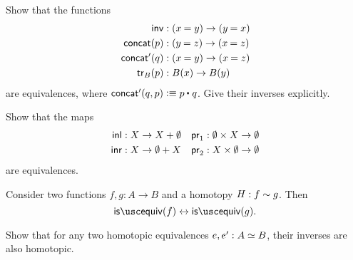 \begin{exercises}
\item \label{ex:equiv_grpd_ops}Show that the functions
  \begin{align*}
    \mathsf{inv} & :(\id{x}{y})\to(\id{y}{x}) \\
    \mathsf{concat}(p) & : (\id{y}{z})\to(\id{x}{z}) \\
    \mathsf{concat'}(q) & : (\id{x}{y}) \to (\id{x}{z}) \\
    \mathsf{tr}_B(p) & :B(x)\to B(y)
  \end{align*}
  are equivalences, where $\mathsf{concat'}(q,p)\defeq \ct{p}{q}$. Give their inverses explicitly.
\item Show that the maps
  \begin{align*}
    {\mathsf{inl}} & : X \to X+\emptyset &     \mathsf{pr}_{1} & : \emptyset \times X \to \emptyset \\
    {\mathsf{inr}} & : X \to \emptyset+X &    \mathsf{pr}_{2} & : X \times \emptyset \to \emptyset
  \end{align*}
  are equivalences.
\item
  \begin{subexenum}
  \item \label{ex:htpy_equiv} Consider two functions $f,g:A\to B$ and a homotopy $H:f\sim g$. Then
    \begin{equation*}
      \isequiv(f)\leftrightarrow\isequiv(g).
    \end{equation*}
  \item Show that for any two homotopic equivalences $e,e':\eqv{A}{B}$, their inverses are also homotopic.
  \end{subexenum}
\item \label{ex:3_for_2}

\end{exercises}
